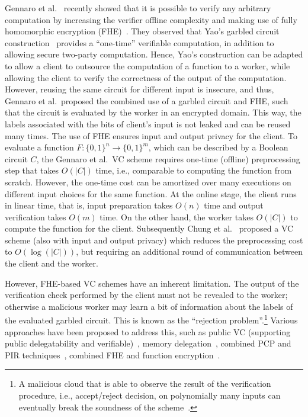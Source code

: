 Gennaro et al.~\cite{GGP10} recently showed that it is possible to verify any arbitrary computation by increasing the verifier offline complexity and making use of fully homomorphic encryption (FHE)~\cite{Gen09}.
They observed that Yao's garbled circuit construction~\cite{Yao82} provides a ``one-time'' verifiable computation, in addition to allowing secure two-party computation.
Hence, Yao's construction can be adapted to allow a client to outsource the computation of a function to a worker, while allowing the client to verify the correctness of the output of the computation.
However, reusing the same circuit for different input is insecure, and thus, Gennaro et al.\ proposed the combined use of a garbled circuit and FHE, such that the circuit is evaluated by the worker in an encrypted domain.
This way, the labels associated with the bits of client's input is not leaked and can be reused many times.
The use of FHE ensures input and output privacy for the client.
To evaluate a function $F:\{0,1\}^n \to \{0,1\}^m$, which can be described by a Boolean circuit $C$, the Gennaro et al.\ VC scheme requires one-time (offline)  preprocessing step that takes $O(|C|)$ time, i.e., comparable to computing the function from scratch.
However, the one-time cost can be amortized over many executions on different input choices for the same function.
At the online stage, the client runs in linear time, that is, input preparation takes $O(n)$ time and output verification takes $O(m)$ time.
On the other hand, the worker takes $O(|C|)$ to compute the function for the client.
Subsequently Chung et al.~\cite{CKV10} proposed a VC scheme (also with input and output privacy) which reduces the preprocessing cost to $O(\log(|C|))$, but requiring an additional round of communication between the client and the worker.

However, FHE-based VC schemes have an inherent limitation.
The output of the verification check performed by the client must not be revealed to the worker; otherwise a malicious worker may learn a bit of information about the labels of the evaluated garbled circuit.
This is known as the ``rejection problem''.\footnote{A malicious cloud that is able to observe the result of the verification procedure, i.e., accept/reject decision, on polynomially many inputs can eventually break the soundness of the scheme~\cite{PRV12}.}
Various approaches have been proposed to address this, such as public VC (supporting public delegatability and verifiable)~\cite{PRV12,PST13}, memory delegation~\cite{CKL+11}, combined PCP and PIR techniques~\cite{BCC+12}, combined FHE and function encryption~\cite{BF12}.

